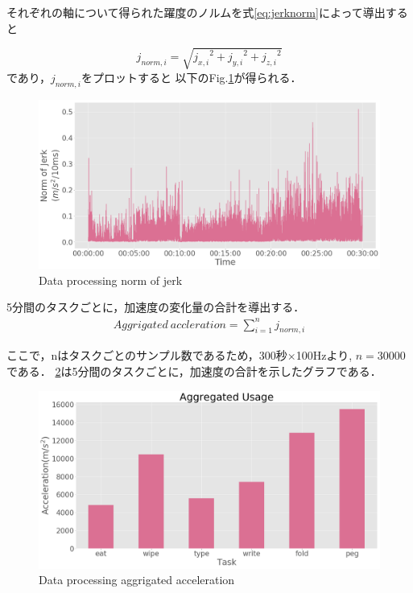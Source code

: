 それぞれの軸について得られた躍度のノルムを式\ref{eq:jerknorm}によって導出すると

\begin{equation}
j_{norm,i} = \sqrt{{j_{x,i}}^2+{j_{y,i}}^2+{j_{z,i}}^2}
\label{eq:jerknorm}
\end{equation}
であり，$j_{norm,i}$をプロットすると
以下のFig.\ref{fig:norm_jerk}が得られる．

\begin{figure}[H]
  \centering
  \includegraphics[width=0.8\linewidth]{fig/norm_jerk}
  \caption{Data processing norm of jerk}
  \label{fig:norm_jerk}
\end{figure}

5分間のタスクごとに，加速度の変化量の合計を導出する．
\begin{eqnarray}
Aggrigated\ accleration  = \sum_{i=1}^n j_{norm,i}
\end{eqnarray}

ここで，nはタスクごとのサンプル数であるため，300秒$\times$100Hzより,
$n=30000$である．
\ref{fig:agg_accel}は5分間のタスクごとに，加速度の合計を示したグラフである．

\begin{figure}[H]
  \centering
  \includegraphics[width=0.8\linewidth]{fig/aggrigated_accel}
  \caption{Data processing aggrigated acceleration}
  \label{fig:agg_accel}
\end{figure}

